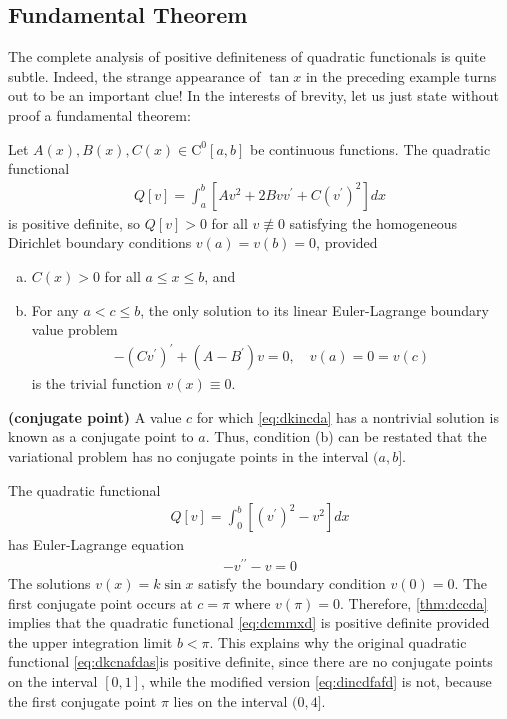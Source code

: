 \documentclass{article}
\newcommand{\bfs}[1]{\textbf{({#1}) }}
\begin{document}
\subsection{Fundamental Theorem}
The complete analysis of positive definiteness of quadratic functionals is quite subtle. Indeed, the strange appearance of $\tan x$ in the preceding example turns out to be an important clue! In the interests of brevity, let us just state without proof a fundamental theorem:
\begin{thma}\label{thm:dccda}
Let $A(x), B(x), C(x) \in \mathrm{C}^{0}[a, b]$ be continuous functions. The quadratic functional
\begin{align*}
Q[v]=\int_{a}^{b}\left[A v^{2}+2 B v v^{\prime}+C\left(v^{\prime}\right)^{2}\right] d x
\end{align*}
is positive definite, so $Q[v]>0$ for all $v \not \equiv 0$ satisfying the homogeneous Dirichlet boundary
conditions $v(a)=v(b)=0$, provided 
\begin{enumerate}[(a).]
    \item $C(x)>0$ for all $a \leq x \leq b$, and
    \item For any $a<c \leq b$, the only solution to its linear Euler-Lagrange boundary value problem
\begin{align}
-\left(C v^{\prime}\right)^{\prime}+\left(A-B^{\prime}\right) v=0, \quad v(a)=0=v(c) \label{eq:dkincda}
\end{align}
is the trivial function $v(x) \equiv 0$.
\end{enumerate}
\end{thma}
\begin{rema}\bfs{conjugate point}
A value $c$ for which \cref{eq:dkincda} has a nontrivial solution is known as a conjugate point to $a$. Thus, condition (b) can be restated that the variational problem has no conjugate points in the interval $(a, b]$.
\end{rema}
\begin{exma}
The quadratic functional
\begin{align}
Q[v]=\int_{0}^{b}\left[\left(v^{\prime}\right)^{2}-v^{2}\right] d x\label{eq:dcmmxd}
\end{align}
has Euler-Lagrange equation
\begin{align*}
-v^{\prime \prime}-v=0
\end{align*}
The solutions $v(x)=k \sin x$ satisfy the boundary condition $v(0)=0$. The first conjugate point occurs at $c=\pi$ where $v(\pi)=0$. Therefore, \cref{thm:dccda} implies that the quadratic functional \cref{eq:dcmmxd} is positive definite provided the upper integration limit $b<\pi$. This explains why the original quadratic functional \cref{eq:dkcnafdas}is positive definite, since there are no conjugate points on the interval $[0,1]$, while the modified version \cref{eq:dincdfafd} is not, because the first conjugate point $\pi$ lies on the interval $(0,4]$.
\end{exma}
\end{document}
